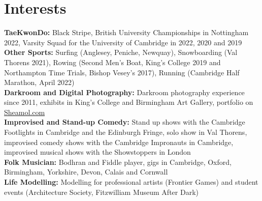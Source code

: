 \documentclass{article}
\begin{document}
\vspace{-.75\baselineskip}
\hrulefill
\vspace{-.75\baselineskip}

\section*{Interests}
\textbf{TaeKwonDo:} Black Stripe, British University Championships in Nottingham 2022, Varsity Squad for the University of Cambridge in 2022, 2020 and 2019\\
\textbf{Other Sports:} Surfing (Anglesey, Peniche, Newquay),
Snowboarding (Val Thorens 2021), 
Rowing (Second Men's Boat, King's College 2019 and Northampton Time Trials, Bishop Vesey's 2017), Running (Cambridge Half Marathon, April 2022)\\
\textbf{Darkroom and Digital Photography:} Darkroom photography experience since 2011,  exhibits in King's College and Birmingham Art Gallery, portfolio on \href{www.sheamol.com}{Sheamol.com}\\
\textbf{Improvised and Stand-up Comedy:} Stand up shows with the Cambridge Footlights in Cambridge and the Edinburgh Fringe, solo show in Val Thorens, improvised comedy shows with the Cambridge Impronauts in Cambridge, improvised musical shows with the Showstoppers in London \\
\textbf{Folk Musician:} Bodhran and Fiddle%
player, gigs in Cambridge, Oxford, Birmingham, Yorkshire, Devon, Calais and Cornwall\\
\textbf{Life Modelling:} Modelling for professional artists (Frontier Games) and student events (Architecture Society, Fitzwilliam Museum After Dark)

\medskip
\vspace{-.75\baselineskip}
\hrulefill
\vspace{-.75\baselineskip}
\end{document}
